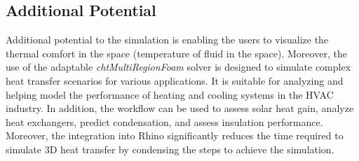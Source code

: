 \subsection{Additional Potential}
Additional potential to the simulation is enabling the users to visualize the thermal comfort in the space (temperature of fluid in the space). Moreover, the use of the adaptable \textit{chtMultiRegionFoam} solver is designed to simulate complex heat transfer scenarios for various applications. It is suitable for analyzing and helping model the performance of heating and cooling systems in the HVAC  industry. In addition, the workflow can be used to assess solar heat gain, analyze heat exchangers, predict condensation, and assess insulation performance. Moreover, the integration into Rhino significantly reduces the time required to simulate 3D heat transfer by condensing the steps to achieve the simulation.



